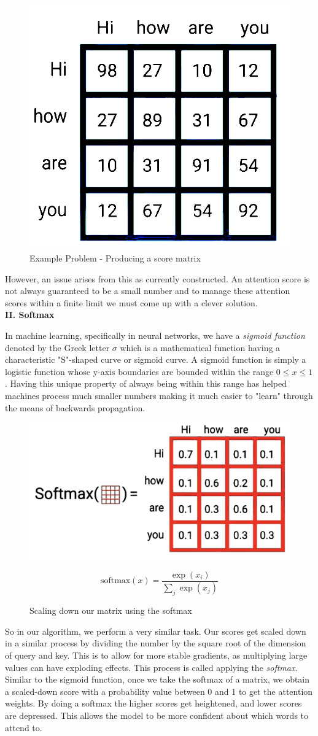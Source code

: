 \begin{figure}[H]
\centering
\includegraphics[width=.3\textwidth]{figures/t6.jpg}
\caption{Example Problem - Producing a score matrix}
\end{figure}

However, an issue arises from this as currently constructed. An attention score is not always guaranteed to be a small number and to manage these attention scores within a finite limit we must come up with a clever solution. \\

\newpage
\noindent
\textbf{II. Softmax}

In machine learning, specifically in neural networks, we have a \emph{sigmoid function} denoted by the Greek letter $\sigma$ which is a mathematical function having a characteristic "S"-shaped curve or sigmoid curve. A sigmoid function is simply a logistic function whose y-axis boundaries are bounded within the range $0\leq x \leq 1$ \cite{ten}. Having this unique property of always being within this range has helped machines process much smaller numbers making it much easier to "learn" through the means of backwards propagation.

\begin{figure}[H]
\centering
\includegraphics[width=.45\textwidth]{figures/t7.jpg}

\begin{equation}
\label{softmax}
\text{softmax}(x) = \frac{\exp({x_{i}})}{\sum_j \exp({x_{j}})}
\end{equation}

\caption{Scaling down our matrix using the softmax}
\end{figure}

So in our algorithm, we perform a very similar task. Our scores get scaled down in a similar process by dividing the number by the square root of the dimension of query and key. This is to allow for more stable gradients, as multiplying large values can have exploding effects. This process is called applying the \emph{softmax}. Similar to the sigmoid function, once we take the softmax of a matrix, we obtain a scaled-down score with a probability value between 0 and 1 to get the attention weights. By doing a softmax the higher scores get heightened, and lower scores are depressed. This allows the model to be more confident about which words to attend to. 

